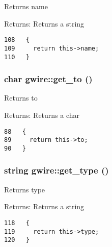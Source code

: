 Returns name

\begin{Desc}
\item[Returns:]Returns a string \end{Desc}


\begin{Code}\begin{verbatim}108   {
109     return this->name;
110   }
\end{verbatim}\end{Code}


\subsubsection{\setlength{\rightskip}{0pt plus 5cm}char gwire::get\_\-to ()\hspace{0.3cm}{\tt  [inline]}}\label{classgwire_2b95d40cce64ea99a613b42b0c39059a}


Returns to

\begin{Desc}
\item[Returns:]Returns a char \end{Desc}


\begin{Code}\begin{verbatim}88   {
89     return this->to;
90   }
\end{verbatim}\end{Code}


\subsubsection{\setlength{\rightskip}{0pt plus 5cm}string gwire::get\_\-type ()\hspace{0.3cm}{\tt  [inline]}}\label{classgwire_063e44070e2e249a02f9ea8f821464e7}


Returns type

\begin{Desc}
\item[Returns:]Returns a string \end{Desc}


\begin{Code}\begin{verbatim}118   {
119     return this->type;
120   }
\end{verbatim}\end{Code}


